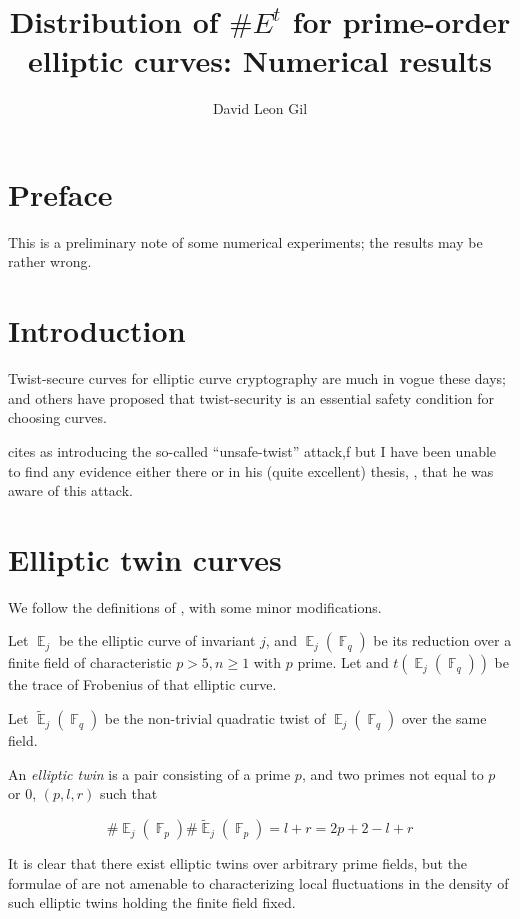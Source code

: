 \documentclass[11pt,fleqn]{article}
\title{Distribution of $\#E^t$ for prime-order elliptic curves: Numerical results}
\author{David Leon Gil}
\newcommand{\Ej}{\ensuremath{\BbbE_j} }
\newcommand{\Ejfq}{\ensuremath{\BbbE_j(\BbbF_q)} }
\newcommand{\Ejfqt}{\ensuremath{\widetilde{\BbbE}_j(\BbbF_q)} }
\newcommand{\Ejfp}{\ensuremath{\BbbE_j(\BbbF_p)} }
\newcommand{\Ejfpt}{\ensuremath{\widetilde{\BbbE}_j(\BbbF_p)} }
\begin{document}
\maketitle

\section{Preface}

This is a preliminary note of some numerical experiments; the results
may be rather wrong.

\section{Introduction}

Twist-secure curves for elliptic curve cryptography are much in vogue
these days; \cite{djb} and others have proposed that twist-security
is an essential safety condition for choosing curves.

\cite{curve25519} cites \cite{KaliskiJCryptology} as introducing the
so-called ``unsafe-twist'' attack,f but I have been unable to find any
evidence either there or in his (quite excellent) thesis, \cite{KaliskiThesis},
that he was aware of this attack.

\section{Elliptic twin curves}

We follow the definitions of \autocite{ShparlinskiSutantyo}, with some minor
modifications.

Let $\Ej$ be the elliptic curve of invariant $j$, and $\Ejfq$ be its reduction
over a finite field of characteristic $p > 5, n \geq 1$ with $p$ prime. Let
and $t(\Ejfq)$ be the trace of Frobenius of that elliptic curve.

Let $\Ejfqt$ be the non-trivial quadratic twist of $\Ejfq$ over the same field.

An \emph{elliptic twin} is a pair consisting of a prime $p$, and two primes
not equal to $p$ or $0$, $(p, {l, r})$ such that

\begin{equation}
\#\Ejfp \#\Ejfpt = l + r = 2 p + 2 - l + r
\end{equation}

It is clear that there exist elliptic twins over arbitrary prime fields, but
the formulae of \autocite{ShparlinskiSutantyo} are not amenable to characterizing
local fluctuations in the density of such elliptic twins holding the finite
field fixed.
\end{document}
